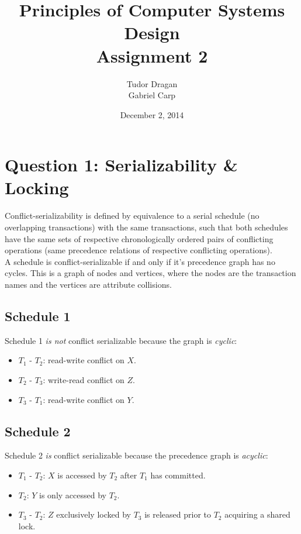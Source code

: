 \documentclass{article}      %
\title{\bf Principles of Computer Systems Design\\ {\Large Assignment 2}}  %
\author{Tudor Dragan\\
Gabriel Carp}      %
\date{December 2, 2014}      %
\begin{document}

\maketitle                   %

\section*{Question 1: Serializability \& Locking} 

Conflict-serializability is defined by equivalence to a serial schedule (no overlapping transactions) with the same transactions, such that both schedules have the same sets of respective chronologically ordered pairs of conflicting operations (same precedence relations of respective conflicting operations).\\

A schedule is conflict-serializable if and only if it's precedence graph has no cycles. This is a graph of nodes and vertices, where the nodes are the transaction names and the vertices are attribute collisions.\\

\subsection*{Schedule 1}

Schedule 1 \emph{is not} conflict serializable because the graph is \emph{cyclic}:
\begin{itemize}
\item $T_1$ - $T_2$: read-write conflict on $X$.
\item $T_2$ - $T_3$: write-read conflict on $Z$.
\item $T_3$ - $T_1$: read-write conflict on $Y$.
\end{itemize}

\subsection*{Schedule 2}

Schedule 2 \emph{is} conflict serializable because the precedence graph is \emph{acyclic}:
\begin{itemize}
\item $T_1$ - $T_2$: $X$ is accessed by $T_2$ after $T_1$ has committed.
\item $T_2$: $Y$ is only accessed by $T_2$.
\item $T_3$ - $T_2$: $Z$ exclusively locked by $T_3$ is released prior to $T_2$ acquiring a
shared lock.
\end{itemize}
\end{document}
